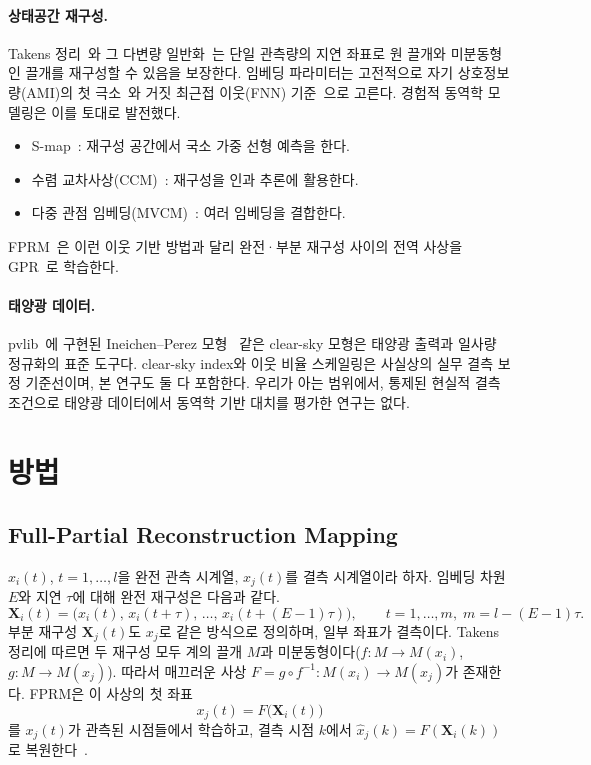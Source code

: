 \documentclass[11pt,a4paper]{article}
\begin{document}
\paragraph{상태공간 재구성.}
Takens 정리~\cite{takens1981}와 그 다변량 일반화~\cite{deyle2011}는 단일 관측량의 지연 좌표로 원 끌개와 미분동형인 끌개를 재구성할 수 있음을 보장한다.
임베딩 파라미터는 고전적으로 자기 상호정보량(AMI)의 첫 극소~\cite{fraser1986}와 거짓 최근접 이웃(FNN) 기준~\cite{kennel1992}으로 고른다.
경험적 동역학 모델링은 이를 토대로 발전했다.
\begin{itemize}
  \item S-map~\cite{sugihara1994}: 재구성 공간에서 국소 가중 선형 예측을 한다.
  \item 수렴 교차사상(CCM)~\cite{sugihara2012}: 재구성을 인과 추론에 활용한다.
  \item 다중 관점 임베딩(MVCM)~\cite{ye2016}: 여러 임베딩을 결합한다.
\end{itemize}
FPRM~\cite{wu2026fprm}은 이런 이웃 기반 방법과 달리 완전·부분 재구성 사이의 전역 사상을 GPR~\cite{rasmussen2006}로 학습한다.

\paragraph{태양광 데이터.}
pvlib~\cite{holmgren2018pvlib}에 구현된 Ineichen--Perez 모형~\cite{ineichen2002} 같은 clear-sky 모형은 태양광 출력과 일사량 정규화의 표준 도구다.
clear-sky index와 이웃 비율 스케일링은 사실상의 실무 결측 보정 기준선이며, 본 연구도 둘 다 포함한다.
우리가 아는 범위에서, 통제된 현실적 결측 조건으로 태양광 데이터에서 동역학 기반 대치를 평가한 연구는 없다.

\section{방법}\label{sec:method}

\subsection{Full-Partial Reconstruction Mapping}

$x_i(t)$, $t=1,\dots,l$을 완전 관측 시계열, $x_j(t)$를 결측 시계열이라 하자.
임베딩 차원 $E$와 지연 $\tau$에 대해 완전 재구성은 다음과 같다.
\begin{equation}
  \mathbf{X}_i(t) = \big(x_i(t),\,x_i(t+\tau),\,\dots,\,x_i(t+(E-1)\tau)\big),\qquad t = 1,\dots,m,\; m = l-(E-1)\tau .
  \label{eq:full}
\end{equation}
부분 재구성 $\mathbf{X}_j(t)$도 $x_j$로 같은 방식으로 정의하며, 일부 좌표가 결측이다.
Takens 정리에 따르면 두 재구성 모두 계의 끌개 $M$과 미분동형이다($f:M\to M(x_i)$, $g:M\to M(x_j)$).
따라서 매끄러운 사상 $F = g\circ f^{-1}: M(x_i)\to M(x_j)$가 존재한다.
FPRM은 이 사상의 첫 좌표
\begin{equation}
  x_j(t) = F\big(\mathbf{X}_i(t)\big)
  \label{eq:map}
\end{equation}
를 $x_j(t)$가 관측된 시점들에서 학습하고, 결측 시점 $k$에서 $\hat x_j(k) = F(\mathbf{X}_i(k))$로 복원한다~\cite[식 11--14]{wu2026fprm}.
\end{document}
